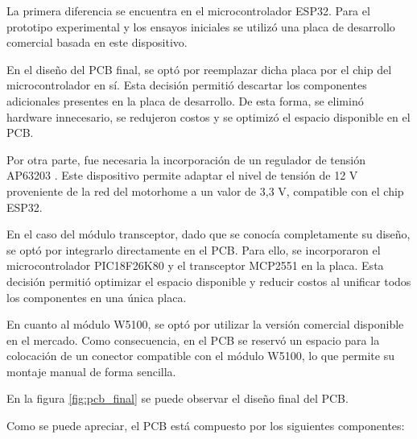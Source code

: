 La primera diferencia se encuentra en el microcontrolador ESP32. Para
el prototipo experimental y los ensayos iniciales se utilizó una placa
de desarrollo comercial basada en este dispositivo.

En el diseño del PCB final, se optó por reemplazar dicha placa por el
chip del microcontrolador en sí. Esta decisión permitió descartar los
componentes adicionales presentes en la placa de desarrollo. De esta
forma, se eliminó hardware innecesario, se redujeron costos y se
optimizó el espacio disponible en el PCB.

Por otra parte, fue necesaria la incorporación de un regulador de
tensión AP63203 \citep{AP63203_datasheet}. Este dispositivo permite adaptar el nivel de tensión
de 12 V proveniente de la red del motorhome a un valor de 3,3 V,
compatible con el chip ESP32.

En el caso del módulo transceptor, dado que se conocía completamente su
diseño, se optó por integrarlo directamente en el PCB. Para ello, se
incorporaron el microcontrolador PIC18F26K80 y el transceptor MCP2551
en la placa. Esta decisión permitió optimizar el espacio disponible y
reducir costos al unificar todos los componentes en una única placa.

En cuanto al módulo W5100, se optó por utilizar la versión comercial
disponible en el mercado. Como consecuencia, en el PCB se reservó un espacio para la colocación
de un conector compatible con el módulo W5100, lo que permite su
montaje manual de forma sencilla.

En la figura \ref{fig:pcb_final} se puede observar el diseño final del PCB.

Como se puede apreciar, el PCB está compuesto por los siguientes componentes:

